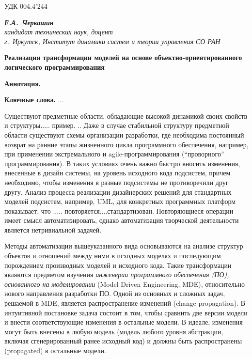\documentclass[12pt]{article}
\begin{document}
УДК 004.4'244
\begin{flushright}\itshape{}
  \textbf{Е.А.~Черкашин}\\
  кандидат технических наук, доцент\\
  г.~Иркутск, Институт динамики систем и теории управления СО РАН
\end{flushright}
\begin{center}
  \Large\bfseries Реализация трансформации моделей на основе объектно-ориентированного логического программирования
\end{center}

\textbf{Аннотация.}

\textbf{Ключвые слова.} ...

Существуют предметные области, обладающие высокой динамикой своих свойств и структуры..... пример. .. Даже в случае стабильной структуру предметной области существуют схемы организации разработки, где необходима постоянный возврат на ранние этапы жизненного цикла программного обеспечения, например, при применении экстремального и agile-программирования (``проворного'' программирования).  В таких условиях очень важно быстро вносить изменения, внесенные в дизайн системы, на уровень исходного кода подсистем, причем необходимо, чтобы изменения в разные подсистемы не противоречили друг другу.  Анализ процесса реализации дизайнерских решений для стандартных моделей подсистем, например, UML, для конкретных программных платформ показывает, что ..... повторяется....стандартизован.  Повторяющиеся операции имеет смысл автоматизировать, однако автоматизация творческой деятельности является нетривиальной задачей.

Методы автоматизации вышеуказанного вида основываются на анализе структур объектов и отношений между ними в исходных моделях и последующим порождением производных моделей и исходного кода.  Такие трансформации являются предметом изучения \emph{инженерии программного обеспечения (ПО), основанного на моделировании} (Model Driven Engineering, MDE), относительно нового направления разработки ПО.  Одной из основных и сложных задач, решаемой в MDE, является распространение изменений (change propagation).  В интуитивной постановке задача состоит в том, чтобы сравнить две версии модели и внести соответствующие изменения в остальные модели.  В идеале, изменения могут быть внесены в любую модель (модель любого уровня абстракции, включая сгенерированный ранее исходный код) и должны быть распространены (propagated) в остальные модели.
\end{document}
